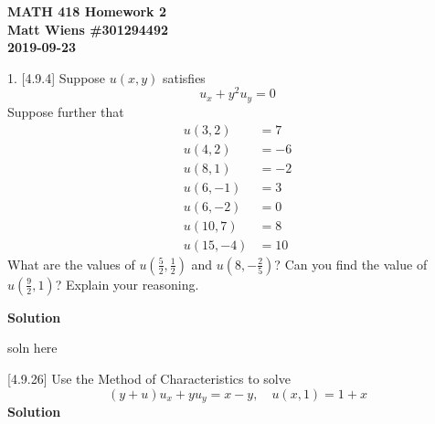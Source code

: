 \documentclass{article}
\begin{document}
\textbf{MATH 418 Homework 2} \\
\textbf{Matt Wiens \#301294492} \\
\textbf{2019-09-23}

1. [4.9.4] Suppose $u(x, y)$ satisfies
%
\begin{equation*}
    u_x+y^2 u_y = 0
\end{equation*}
%
Suppose further that
%
\begin{align*}
    u(3, 2) &= 7 \\
    u(4, 2) &= -6 \\
    u(8, 1) &= -2 \\
    u(6, -1) &= 3 \\
    u(6, -2) &= 0 \\
    u(10, 7) &= 8 \\
    u(15, -4) &= 10
\end{align*}
%
What are the values of $u\left(\frac{5}{2}, \frac{1}{2}\right)$ and
$u\left(8,-\frac{2}{5}\right)$? Can you find the value of
$u\left(\frac{9}{2},1\right)$? Explain your reasoning.

\textbf{Solution}

soln here

\vspace{5mm}

[4.9.26] Use the Method of Characteristics to solve
%
\begin{equation*}
    (y + u) u_x + y u_y = x - y, \quad u(x, 1) = 1 + x
\end{equation*}
%
\textbf{Solution}
\end{document}
